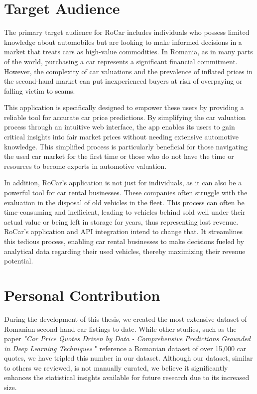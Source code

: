\section{Target Audience}

The primary target audience for RoCar includes individuals who possess limited knowledge about automobiles but are looking to make informed decisions in a market that treats cars as high-value commodities. In Romania, as in many parts of the world, purchasing a car represents a significant financial commitment. However, the complexity of car valuations and the prevalence of inflated prices in the second-hand market can put inexperienced buyers at risk of overpaying or falling victim to scams.

This application is specifically designed to empower these users by providing a reliable tool for accurate car price predictions. By simplifying the car valuation process through an intuitive web interface, the app enables its users to gain critical insights into fair market prices without needing extensive automotive knowledge. This simplified process is particularly beneficial for those navigating the used car market for the first time or those who do not have the time or resources to become experts in automotive valuation.

In addition, RoCar's application is not just for individuals, as it can also be a powerful tool for car rental businesses. These companies often struggle with the evaluation in the disposal of old vehicles in the fleet. This process can often be time-consuming and inefficient, leading to vehicles behind sold well under their actual value or being left in storage for years, thus representing lost revenue. RoCar's application and API integration intend to change that. It streamlines this tedious process, enabling car rental businesses to make decisions fueled by analytical data regarding their used vehicles, thereby maximizing their revenue potential.

\section{Personal Contribution}

During the development of this thesis, we created the most extensive dataset of Romanian second-hand car listings to date. While other studies, such as the paper \textit{"Car Price Quotes Driven by Data - Comprehensive Predictions Grounded in Deep Learning Techniques} " \cite{dutulescu2023car} reference a Romanian dataset of over 15,000 car quotes, we have tripled this number in our dataset. Although our dataset, similar to others we reviewed, is not manually curated, we believe it significantly enhances the statistical insights available for future research due to its increased size.

